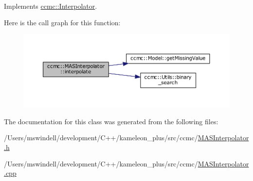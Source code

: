 Implements \hyperlink{classccmc_1_1_interpolator_aa6b272bd53630020d92938ec1e5cfad9}{ccmc\-::\-Interpolator}.



Here is the call graph for this function\-:
\nopagebreak
\begin{figure}[H]
\begin{center}
\leavevmode
\includegraphics[width=350pt]{classccmc_1_1_m_a_s_interpolator_ab4015bfd559e1eac116ef1772be91b03_cgraph}
\end{center}
\end{figure}




The documentation for this class was generated from the following files\-:\begin{DoxyCompactItemize}
\item 
/\-Users/mswindell/development/\-C++/kameleon\-\_\-plus/src/ccmc/\hyperlink{_m_a_s_interpolator_8h}{M\-A\-S\-Interpolator.\-h}\item 
/\-Users/mswindell/development/\-C++/kameleon\-\_\-plus/src/ccmc/\hyperlink{_m_a_s_interpolator_8cpp}{M\-A\-S\-Interpolator.\-cpp}\end{DoxyCompactItemize}
